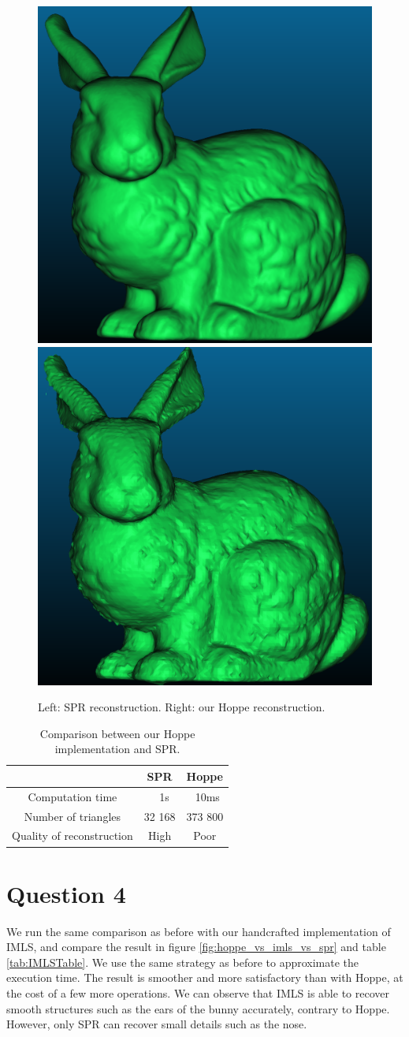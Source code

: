 \documentclass[a4paper]{article}
\begin{document}
\begin{figure}[ht]
  \centering
  \includegraphics[width=0.3\linewidth]{figures/SPR.png}
  \includegraphics[width=0.3\linewidth]{figures/Hoppe.png}
  \caption{Left: SPR reconstruction. Right: our Hoppe reconstruction.}
  \label{fig:hoppe_vs_spr}
\end{figure}

\begin{table}
    \centering
    \begin{tabular}{|c|c|c|}
      \hline
         & SPR & Hoppe \\
      \hline
      Computation time & ~ 1s & ~10ms \\
      Number of triangles & 32 168 & 373 800 \\
      Quality of reconstruction & High & Poor \\
      \hline
    \end{tabular}
    \caption{Comparison between our Hoppe implementation and SPR.}
    \label{tab:HoppeTable}
  \end{table}

\section*{Question 4}
We run the same comparison as before with our handcrafted implementation of IMLS,
and compare the result in figure \ref{fig:hoppe_vs_imls_vs_spr} and table \ref{tab:IMLSTable}. We use
the same strategy as before to approximate the execution time. The result is
smoother and more satisfactory than with Hoppe, at the cost of a few
more operations. We can observe that IMLS is able to recover smooth structures such
as the ears of the bunny accurately, contrary to Hoppe. However, only SPR can recover small details
such as the nose.
\end{document}
